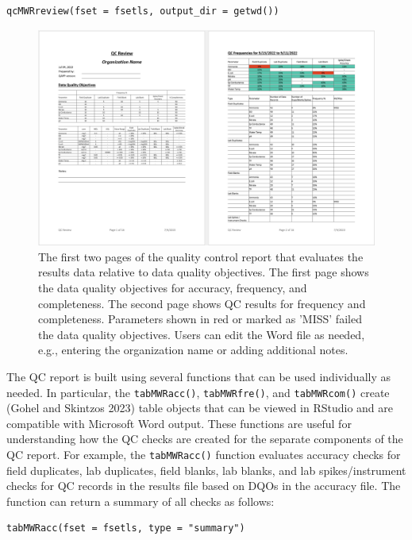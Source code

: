 \begin{verbatim}
qcMWRreview(fset = fsetls, output_dir = getwd())
\end{verbatim}

\begin{figure}
\includegraphics[width=1\linewidth]{figs/qcex} \caption{The first two pages of the quality control report that evaluates the results data relative to data quality objectives.  The first page shows the data quality objectives for accuracy, frequency, and completeness.  The second page shows QC results for frequency and completeness.  Parameters shown in red or marked as 'MISS' failed the data quality objectives.  Users can edit the Word file as needed, e.g., entering the organization name or adding additional notes.}\label{fig:qcex}
\end{figure}

The QC report is built using several functions that can be used individually as needed. In particular, the \texttt{tabMWRacc()}, \texttt{tabMWRfre()}, and \texttt{tabMWRcom()} create  (Gohel and Skintzos 2023) table objects that can be viewed in RStudio and are compatible with Microsoft Word output. These functions are useful for understanding how the QC checks are created for the separate components of the QC report. For example, the \texttt{tabMWRacc()} function evaluates accuracy checks for field duplicates, lab duplicates, field blanks, lab blanks, and lab spikes/instrument checks for QC records in the results file based on DQOs in the accuracy file. The function can return a summary of all checks as follows:

\begin{verbatim}
tabMWRacc(fset = fsetls, type = "summary")
\end{verbatim}

